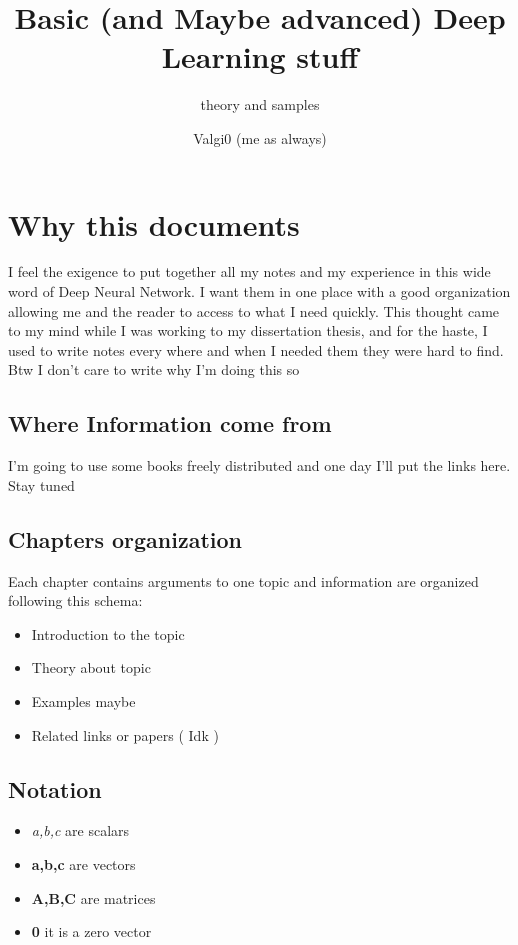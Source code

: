 \documentclass[12pt,a4paper,twoside,openright]{scrbook}
\title{Basic (and Maybe advanced) Deep Learning stuff }
\subtitle{theory and samples}
\author{Valgi0 (me as always)}
\begin{document}
\frontmatter 

\maketitle


\newpage

\tableofcontents

\newpage

\listoffigures

\mainmatter

\pagestyle{fancy} 
\fancyhead[LO]{\nouppercase{\rightmark}}
\fancyhead[RE]{\nouppercase{\leftmark}}
\fancyhead[LE,RO]{\thepage}
\fancyfoot{}

\chapter{Why this documents}
I feel the exigence to put together all my notes and my experience in this wide word of Deep Neural Network. I want them in one place with a good organization allowing me and the reader to access to what I need quickly. This thought came to my mind while I was working to my dissertation thesis, and for the haste, I used to write notes every where and when I needed them they were hard to find. Btw I don't care to write why I'm doing this so

\section{Where Information come from}
I'm going to use some books freely distributed and one day I'll put the links here. Stay tuned

\section{Chapters organization}
Each chapter contains arguments to one topic and information are organized following this schema:
\begin{itemize}
\item Introduction to the topic
\item Theory about topic
\item Examples maybe
\item Related links or papers ( Idk )
\end{itemize}

\section{Notation}
\begin{itemize}
\item \textit{a,b,c} are scalars
\item \textbf{a,b,c} are vectors
\item \textbf{A,B,C} are matrices
\item \textbf{0} it is a zero vector
\end{itemize}
\end{document}
